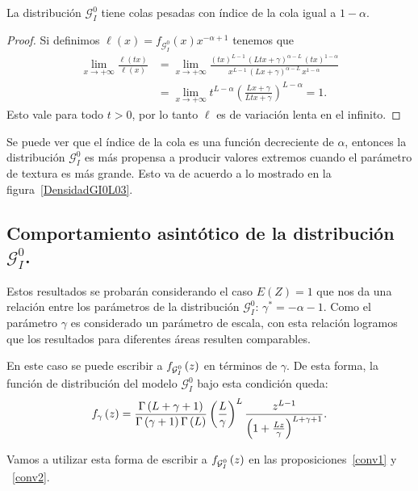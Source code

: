 \begin{proposition}
	La distribución $\mathcal G_{I}^0$ tiene colas pesadas con índice de la cola igual a $1-\alpha$.
\end{proposition}
\begin{proof}
	Si definimos $\ell(x)=f_{\mathcal G_I^0}(x) x^{-\alpha+1}$ tenemos que
	\begin{align*}
	\lim_{x\to+\infty}\frac{\ell(t x)}{\ell(x)}&=\lim_{x\to+\infty}\frac{(tx)^{L-1} \, (Ltx+\gamma)^{\alpha-L} \, (tx)^{1-\alpha}}{x^{L-1} \, (Lx+\gamma)^{\alpha-L} \, x^{1-\alpha}}\\
	&=\lim_{x\to+\infty}t^{L-\alpha}\left(\frac{Lx+\gamma}{L tx+\gamma}\right)^{L-\alpha}=1.
	\end{align*}
	Esto vale para todo $t>0$, por lo tanto $\ell$ es de variación lenta en el infinito.
\end{proof}
Se puede ver que el índice de la cola es una función decreciente de $\alpha$, entonces la distribución $\mathcal G_I^0$ es más propensa a producir valores extremos cuando el parámetro de textura es más grande. Esto va de acuerdo a lo mostrado en la figura~\ref{DensidadGI0L03}.

\subsection{Comportamiento asintótico de la distribución $\mathcal{G}_I^0$.}
Estos resultados se probarán considerando el caso $E(Z)=1$ que nos da una relación entre los parámetros de la distribución $\mathcal{G}_I^0$: $\gamma^*=-\alpha-1$. Como el parámetro $\gamma$ es considerado un parámetro de escala, con esta relación logramos que los resultados para diferentes áreas resulten comparables.
 
En este caso se puede escribir a $f_{\mathcal{G}_I^0}\left( z \right)$ en términos de $\gamma$. De esta forma, la función de distribución del modelo $\mathcal{G}_I^0$ bajo esta condición queda:
\begin{align}
\label{fenfunciondegamma}
f_{\gamma}\left( z \right)=\frac{\Gamma\left( L+\gamma+1 \right)}{\Gamma\left( \gamma+1 \right)\Gamma\left( L \right)}
\left( \frac{L}{\gamma} \right)^L \frac{z^{L-1}}{\left( 1+\frac{Lz}{\gamma} \right)^{L+\gamma+1}}.
\end{align}

Vamos a utilizar esta forma de escribir a $f_{\mathcal{G}_I^0}\left( z \right)$ en las proposiciones~\ref{conv1} y ~\ref{conv2}.


